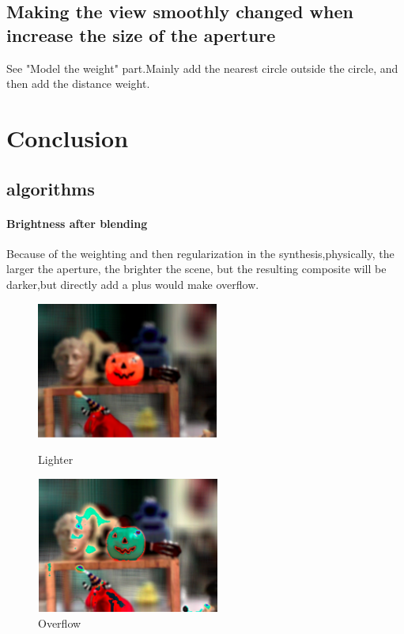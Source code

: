 \documentclass[letterpaper,12pt]{article}
\begin{document}
\subsection{Making the view smoothly changed when increase the size of the aperture}
See "Model the weight" part.Mainly add the nearest circle outside the circle, and then add the distance weight.
\section{Conclusion}
\subsection{algorithms}
\paragraph{Brightness after blending}
Because of the weighting and then regularization in the synthesis,physically, the larger the aperture, the brighter the scene, but the resulting composite will be darker,but directly add a plus would make overflow.
	\begin{figure}[htbp]
	\centering
	\begin{minipage}[t]{0.48\textwidth}
		\centering
		\includegraphics[width=6cm]{Image/size4l.png}
		\caption{Lighter}
	\end{minipage}
	\begin{minipage}[t]{0.48\textwidth}
		\centering
		\includegraphics[width=6cm]{Image/size4o.png}
		\caption{Overflow}
	\end{minipage}
\end{figure}
\end{document}
